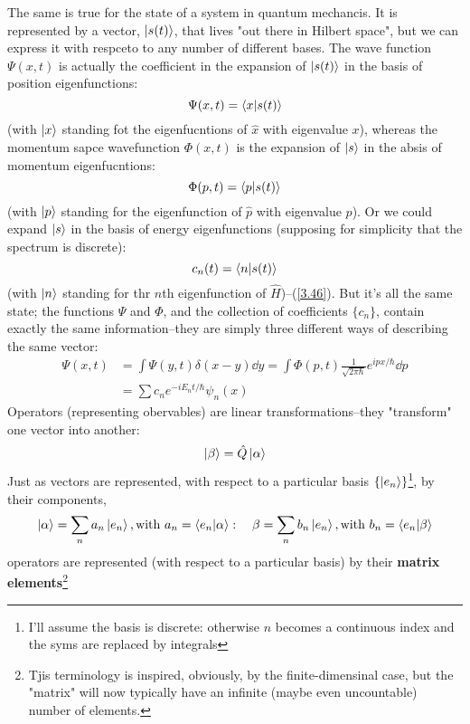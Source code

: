 The same is true for the state of a system in quantum mechancis. It is represented by a vector, $\ket{s(t)}$, that lives "out there in Hilbert space", but we can express it with respceto to any number of different bases. The wave function $\Psi(x,t)$ is actually the coefficient in the expansion of $\ket{s(t)}$ in the basis of position eigenfunctions:
\begin{equation}\label{3.75}
	\Psi(x,t)=\braket{x}{s(t)}
\end{equation}
(with $\ket{x}$ standing fot the eigenfucntions of $\hat{x}$ with eigenvalue $x$), whereas the momentum sapce wavefunction $\Phi(x,t)$ is the expansion of $\ket{s}$ in the absis of momentum eigenfucntions:
\begin{equation}\label{3.76}
	\Phi(p,t)=\braket{p}{s(t)}
\end{equation}
(with $\ket{p}$ standing for the eigenfunction of $\hat{p}$ with eigenvalue $p$). Or we could expand $\ket{s}$ in the basis of energy eigenfunctions (supposing for simplicity that the spectrum is discrete):
\begin{equation}\label{3.77}
	c_n(t)=\braket{n}{s(t)}
\end{equation}
(with $\ket{n}$ standing for thr $n$th eigenfunction of $\hat{H}$)--(\ref{3.46}). But it's all the same state; the functions $\Psi$ and $\Phi$, and the collection of coefficients $\{c_n\}$, contain exactly the same information--they are simply three different ways of describing the same vector:
\begin{align}
	\nonumber \Psi(x,t)&=\int\Psi(y,t)\delta(x-y)\dd y=\int\Phi(p,t)\frac{1}{\sqrt{2\pi\hbar}}e^{ipx/\hbar}\dd  p\\
										 &=\sum c_ne^{-iE_nt/\hbar}\psi_n(x)\label{3.78}
\end{align}
Operators (representing obervables) are linear transformations--they "transform" one vector into another:
\begin{equation}\label{3.79}
	\ket{\beta}=\hat{Q}\ket{\alpha}
\end{equation}
Just as vectors are represented, with respect to a particular basis $\{\ket{e_n}\}$\footnote{I'll assume the basis is discrete: otherwise $n$ becomes a continuous index and the syms are replaced by integrals}, by their components,
\begin{equation}\label{3.80}
	\ket{\alpha}=\sum_n a_n\ket{e_n}, \mbox{with } a_n=\braket{e_n}{\alpha}:\quad \beta=\sum_n b_n\ket{e_n}, \mbox{with } b_n=\braket{e_n}{\beta}
\end{equation}
operators are represented (with respect to a particular basis) by their \textbf{matrix elements}\footnote{Tjis terminology is inspired, obviously, by the finite-dimensinal case, but the "matrix" will now typically have an infinite (maybe even uncountable) number of elements.}
